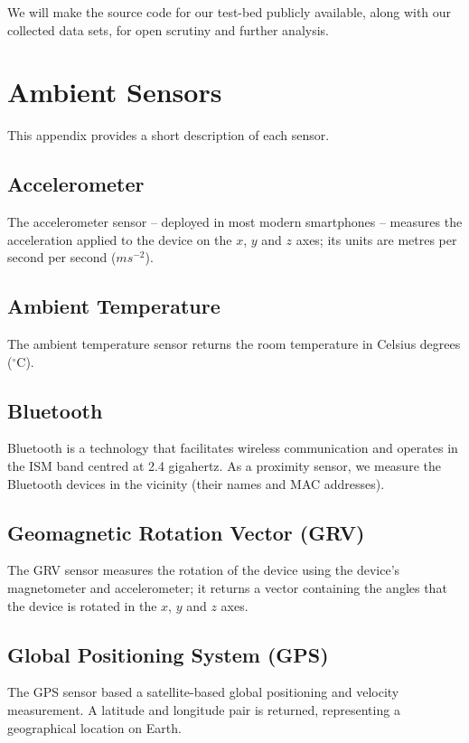 \documentclass[runningheads,a4paper]{llncs}
\begin{document}
We will make the source code for our test-bed publicly available, along with our collected data sets, for open scrutiny and further analysis.




\appendix
\section{Ambient Sensors}
\label{sec:AmbientSensors}
This appendix provides a short description of each sensor. 

\subsection{Accelerometer}
The accelerometer sensor -- deployed in most modern smartphones -- measures the acceleration applied to the device on the $x$, $y$ and $z$ axes; its units are metres per second per second ($ms^{-2}$).

\subsection{Ambient Temperature}
The ambient temperature sensor returns the room temperature in Celsius degrees ($^{\circ}$C).

\subsection{Bluetooth}
Bluetooth is a technology that facilitates wireless communication and operates in the ISM band centred at 2.4 gigahertz.  As a proximity sensor, we measure the Bluetooth devices in the vicinity (their names and MAC addresses).


\subsection{Geomagnetic Rotation Vector (GRV)}
The GRV sensor measures the rotation of the device using the device's magnetometer and accelerometer; it returns a vector containing the angles that the device is rotated in the $x$, $y$ and $z$ axes.

\subsection{Global Positioning System (GPS)}
The GPS sensor based a satellite-based global positioning and velocity measurement. A latitude and longitude pair is returned, representing a geographical location on Earth.
\end{document}
